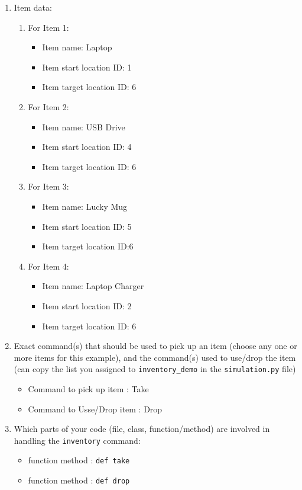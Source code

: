 \documentclass[11pt]{article}
\begin{document}
\begin{enumerate}
\item Item data:
\begin{enumerate}
    \item For Item 1:
    \begin{itemize}
    \item Item name: Laptop
    \item Item start location ID: 1
    \item Item target location ID: 6
    \end{itemize}
        \item For Item 2: 
    \begin{itemize}
    \item Item name: USB Drive
    \item Item start location ID: 4
    \item Item target location ID: 6
    \end{itemize}
        \item For Item 3:
    \begin{itemize}
    \item Item name: Lucky Mug
    \item Item start location ID: 5
    \item Item target location ID:6
    \end{itemize}
        \item For Item 4:
    \begin{itemize}
    \item Item name: Laptop Charger
    \item Item start location ID: 2
    \item Item target location ID: 6
    \end{itemize}
\end{enumerate}

    \item Exact command(s) that should be used to pick up an item (choose any one or more items for this example), and the command(s) used to use/drop the item (can copy the list you assigned to 
    \texttt{inventory\_demo} in the \texttt{simulation.py} file)
        \begin{itemize}
            \item Command to pick up item : Take
            \item Command to Usse/Drop item : Drop
        \end{itemize}

            
    \item Which parts of your code (file, class, function/method) are involved in handling the \texttt{inventory} command:
    \begin{itemize}
        \item function method : \texttt{def take}
        \item function method : \texttt{def drop}
    \end{itemize}
\end{enumerate}
\end{document}
